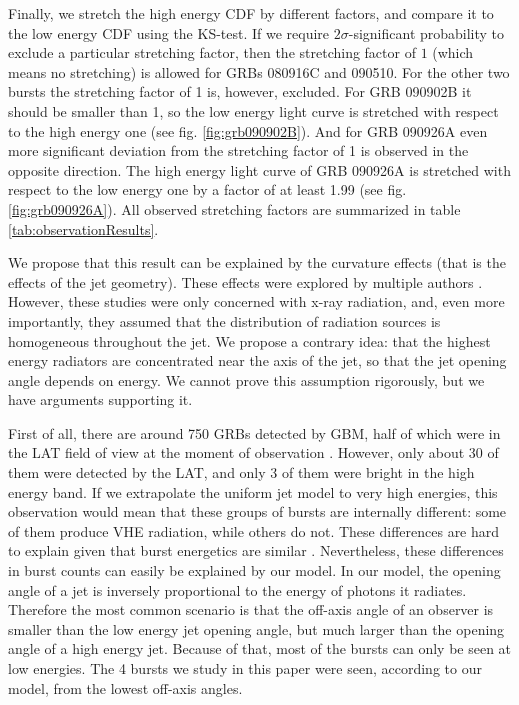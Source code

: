 \documentclass{article}
\begin{document}
	Finally, we stretch the high energy CDF by different factors, and compare it to the low energy CDF using the KS-test.
	If we require $2\sigma$-significant probability to exclude a particular stretching factor, then the stretching factor of $1$ (which means no stretching) is allowed for GRBs 080916C and 090510.
	For the other two bursts the stretching factor of 1 is, however, excluded.
	For GRB 090902B it should be smaller than 1, so the low energy light curve is stretched with respect to the high energy one (see fig. \ref{fig:grb090902B}).
	And for GRB 090926A even more significant deviation from the stretching factor of 1 is observed in the opposite direction.
	The high energy light curve of GRB 090926A is stretched with respect to the low energy one by a factor of at least 1.99 (see fig. \ref{fig:grb090926A}).
	All observed stretching factors are summarized in table \ref{tab:observationResults}.

	We propose that this result can be explained by the curvature effects (that is the effects of the jet geometry).
	These effects were explored by multiple authors \cite{Nakamura:2001kd,Shen:2005ea,Shenoy:2013cba}.
	However, these studies were only concerned with x-ray radiation, and, even more importantly, they assumed that the distribution of radiation sources is homogeneous throughout the jet.
	We propose a contrary idea: that the highest energy radiators are concentrated near the axis of the jet, so that the jet opening angle depends on energy.
	We cannot prove this assumption rigorously, but we have arguments supporting it.

	First of all, there are around 750 GRBs detected by GBM, half of which were in the LAT field of view at the moment of observation \cite{Vianello:2013ela}.
	However, only about 30 of them were detected by the LAT, and only 3 of them were bright in the high energy band.
	If we extrapolate the uniform jet model to very high energies, this observation would mean that these groups of bursts are internally different: some of them produce VHE radiation, while others do not.
	These differences are hard to explain given that burst energetics are similar \cite{Bloom:2003wy}.
	Nevertheless, these differences in burst counts can easily be explained by our model.
	In our model, the opening angle of a jet is inversely proportional to the energy of photons it radiates.
	Therefore the most common scenario is that the off-axis angle of an observer is smaller than the low energy jet opening angle, but much larger than the opening angle of a high energy jet.
	Because of that, most of the bursts can only be seen at low energies.
	The 4 bursts we study in this paper were seen, according to our model, from the lowest off-axis angles.
\end{document}
